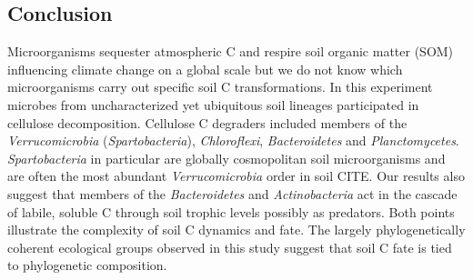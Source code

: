 \subsection{Conclusion} 
Microorganisms sequester atmospheric C and respire soil organic matter (SOM)
influencing climate change on a global scale but we do not know which
microorganisms carry out specific soil C transformations. In this experiment
microbes from uncharacterized yet ubiquitous soil lineages
participated in cellulose decomposition. Cellulose C degraders included members
of the \textit{Verrucomicrobia} (\textit{Spartobacteria}),
\textit{Chloroflexi}, \textit{Bacteroidetes} and \textit{Planctomycetes}.
\textit{Spartobacteria} in particular are globally cosmopolitan soil
microorganisms and are often the most abundant \textit{Verrucomicrobia} order
in soil CITE. Our results also suggest that members of the
\textit{Bacteroidetes} and \textit{Actinobacteria} act in the cascade of
labile, soluble C through soil trophic levels possibly as predators. Both
points illustrate the complexity of soil C dynamics and fate. The largely
phylogenetically coherent ecological groups observed in this study suggest that
soil C fate is tied to phylogenetic composition.
